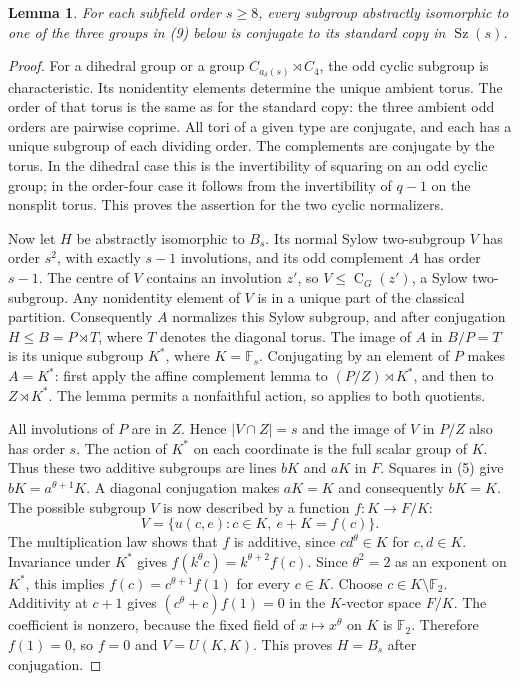 \documentclass[11pt,a4paper]{article}
\newtheorem{lemma}[theorem]{Lemma}
\newcommand{\F}{\mathbb F}
\newcommand{\Sz}{\operatorname{Sz}}
\newcommand{\C}{\operatorname{C}}
\begin{document}
\begin{lemma}\label{embeddings}
For each subfield order $s\ge8$, every subgroup abstractly
isomorphic to one of the three groups in (9) below is conjugate
to its standard copy in $\Sz(s)$.
\end{lemma}
\begin{proof}
For a dihedral group or a group $C_{a_\delta(s)}\rtimes C_4$,
the odd cyclic subgroup is characteristic. Its nonidentity
elements determine the unique ambient torus. The order of that
torus is the same as for the standard copy: the three ambient
odd orders are pairwise coprime. All tori of a given type are
conjugate, and each has a unique subgroup of each dividing
order. The complements are conjugate by the torus. In the
dihedral case this is the invertibility of squaring on an odd
cyclic group; in the order-four case it follows from the
invertibility of $q-1$ on the nonsplit torus. This proves the
assertion for the two cyclic normalizers.

Now let $H$ be abstractly isomorphic to $B_s$. Its normal Sylow
two-subgroup $V$ has order $s^2$, with exactly $s-1$ involutions,
and its odd complement $A$ has order $s-1$. The centre of $V$
contains an involution $z'$, so $V\le\C_G(z')$, a Sylow
two-subgroup. Any nonidentity element of $V$ is in a unique
part of the classical partition. Consequently $A$ normalizes
this Sylow subgroup, and after conjugation $H\le B=P\rtimes T$,
where $T$ denotes the diagonal torus.
The image of $A$ in $B/P=T$ is its unique subgroup $K^*$,
where $K=\F_s$. Conjugating by an element of $P$ makes
$A=K^*$: first apply the affine complement lemma to
$(P/Z)\rtimes K^*$, and then to $Z\rtimes K^*$. The lemma
permits a nonfaithful action, so applies to both quotients.

All involutions of $P$ are in $Z$. Hence $|V\cap Z|=s$ and
the image of $V$ in $P/Z$ also has order $s$. The action of
$K^*$ on each coordinate is the full scalar group of $K$.
Thus these two additive subgroups are lines $bK$ and $aK$
in $F$. Squares in (5) give $bK=a^{\theta+1}K$. A diagonal
conjugation makes $aK=K$ and consequently $bK=K$.
The possible subgroup $V$ is now described by a function
$f:K\longrightarrow F/K$:
\[
       V=\{u(c,e):c\in K,\ e+K=f(c)\}.
\]
The multiplication law shows that $f$ is additive, since
$c d^\theta\in K$ for $c,d\in K$. Invariance under $K^*$
gives $f(k^\theta c)=k^{\theta+2}f(c)$. Since
$\theta^2=2$ as an exponent on $K^*$, this implies
$f(c)=c^{\theta+1}f(1)$ for every $c\in K$.
Choose $c\in K\setminus\F_2$. Additivity at $c+1$ gives
$(c^\theta+c)f(1)=0$ in the $K$-vector space $F/K$.
The coefficient is nonzero, because the fixed field of
$x\mapsto x^\theta$ on $K$ is $\F_2$. Therefore $f(1)=0$,
so $f=0$ and $V=U(K,K)$. This proves $H=B_s$ after conjugation.
\end{proof}
\end{document}
